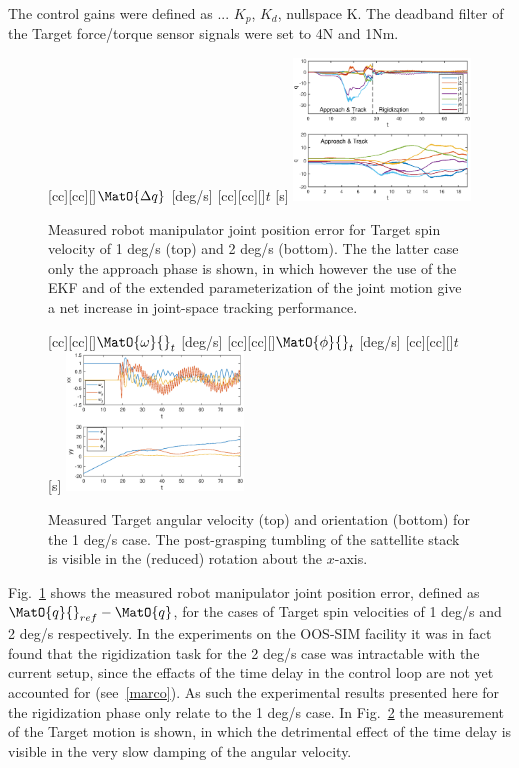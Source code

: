 The control gains were defined as ... $K_p$, $K_d$, nullspace K. The deadband filter of the Target force/torque sensor signals were set to 4N and 1Nm.

%
\begin{figure}[t!]
[cc][cc][\FontFigB]{$\MatO{\Delta{q}}$ [deg/s]}
[cc][cc][\FontFigB]{$t$ [s]}
\centering\includegraphics[angle=0,width=0.42\textwidth]{./figures/joint_space_motion_2subplots}
\caption{Measured robot manipulator joint position error for Target spin velocity of 1 deg/s (top) and 2 deg/s (bottom). The the latter case only the approach phase is shown, in which however the use of the EKF and of the extended parameterization of the joint motion give a net increase in joint-space tracking performance.}
\label{fig:joint_space_motion_2subplots}
\end{figure}
%
%
\begin{figure}[t!]
[cc][cc][\FontFigB]{$\MatO{\omega}{}_{t}$ [deg/s]}
[cc][cc][\FontFigB]{$\MatO{\phi}{}_{t}$ [deg/s]}
[cc][cc][\FontFigB]{$t$ [s]}
\centering\includegraphics[angle=0,width=0.42\textwidth]{./figures/Target_motion}
\caption{Measured Target angular velocity (top) and orientation (bottom) for the 1 deg/s case. The post-grasping tumbling of the sattellite stack is visible in the (reduced) rotation about the $x$-axis.}
\label{fig:Target_motion}
\end{figure}
%

Fig.~\ref{fig:joint_space_motion_2subplots} shows the measured robot manipulator joint position error, defined as $\MatO{q}{}_{ref}-\MatO{q}$, for the cases of Target spin velocities of 1 deg/s and 2 deg/s respectively. In the experiments on the OOS-SIM facility it was in fact found that the rigidization task for the 2 deg/s case was intractable with the current setup, since the effacts of the time delay in the control loop are not yet accounted for (see~\ref{marco}). As such the experimental results presented here for the rigidization phase only relate to the 1 deg/s case. In Fig.~\ref{fig:Target_motion} the measurement of the Target motion is shown, in which the detrimental effect of the time delay is visible in the very slow damping of the angular velocity. 

